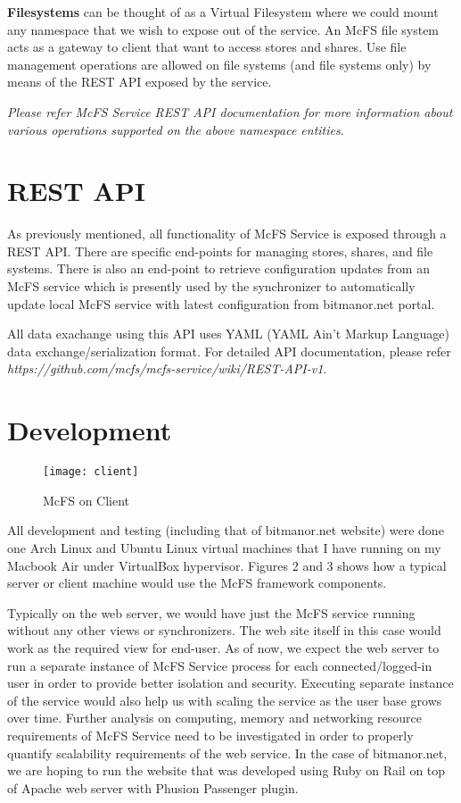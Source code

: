 \textbf{Filesystems} can be thought of as a Virtual Filesystem where we could mount any namespace that we wish to expose out of the service. An McFS file system acts as a gateway to client that want to access stores and shares. Use file management operations are allowed on file systems (and file systems only) by means of the REST API exposed by the service.

\emph{Please refer McFS Service REST API documentation for more information about various operations supported on the above namespace entities}.

\section {REST API}
As previously mentioned, all functionality of McFS Service is exposed through a REST API. There are specific end-points for managing stores, shares, and file systems. There is also an end-point to retrieve configuration updates from an McFS service which is presently used by the synchronizer to automatically update local McFS service with latest configuration from bitmanor.net portal.

All data exachange using this API uses YAML (YAML Ain't Markup Language) data exchange/serialization format. For detailed API documentation, please refer \emph{https://github.com/mcfs/mcfs-service/wiki/REST-API-v1}.

\section{Development}

\begin{figure*}
  \centering
  \texttt{[image: client]}
  \caption{McFS on Client}
\end{figure*}

All development and testing (including that of bitmanor.net website) were done one Arch Linux and Ubuntu Linux virtual machines that I have running on my Macbook Air under VirtualBox hypervisor. Figures 2 and 3 shows how a typical server or client machine would use the McFS framework components.

Typically on the web server, we would have just the McFS service running without any other views or synchronizers. The web site itself in this case would work as the required view for end-user. As of now, we expect the web server to run a separate instance of McFS Service process for each connected/logged-in user in order to provide better isolation and security. Executing separate instance of the service would also help us with scaling the service as the user base grows over time. Further analysis on computing, memory and networking resource requirements of McFS Service need to be investigated in order to properly quantify scalability requirements of the web service. In the case of bitmanor.net, we are hoping to run the website that was developed using Ruby on Rail on top of Apache web server with Phusion Passenger plugin.

